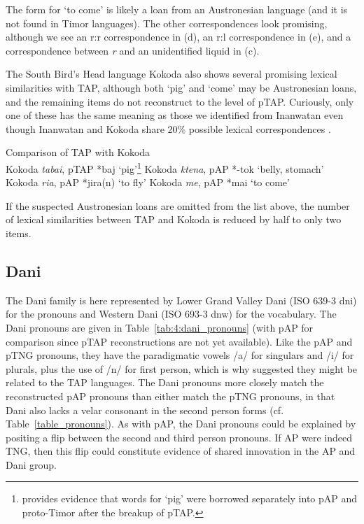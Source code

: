 The form for `to come' is likely a loan from an Austronesian language (and it is not found in Timor languages). The other correspondences look promising, although we see an r:r correspondence in (d), an r:l correspondence in (e), and a correspondence between \textit{r} and an unidentified liquid in (c).

The South Bird's Head language Kokoda also shows several promising lexical similarities with TAP, although both `pig' and `come' may be Austronesian loans, and the remaining items do not reconstruct to the level of pTAP. Curiously, only one of these has the same meaning as those we identified from Inanwatan even though Inanwatan and Kokoda share 20\% possible lexical correspondences \citep[133]{DeVries2004}.

\enlargethispage{1em}

\ea%
\label{ex:4:57}
\upshape 
  Comparison of TAP with Kokoda \citep{DeVries2004} \\
  \ea \upshape Kokoda \textit{ta{\textprimstress}bai}, pTAP *baj `pig'\footnote{\citet{Robinsontaalorpantar} provides evidence that words for `pig' were borrowed separately into pAP and proto-Timor after the breakup of pTAP.}
  \ex \upshape  Kokoda \textit{k{\textopeno}{\textprimstress}tena}, pAP *-tok `belly, stomach'
  \ex \upshape  Kokoda \textit{{\textprimstress}{\textbardotlessj}{\textepsilon}ria}, pAP *jira(n) `to fly'
  \ex \upshape  Kokoda \textit{m{\textopeno}e}, pAP *mai `to come' 
  \z
\z

If the suspected Austronesian loans are omitted from the list above, the number of lexical similarities between TAP and Kokoda is reduced by half to only two items.

\subsection{Dani}
The Dani family is here represented by Lower Grand Valley Dani (ISO 639-3 dni) for the pronouns and Western Dani (ISO 693-3 dnw) for the vocabulary. The Dani pronouns are given in Table~\ref{tab:4:dani_pronouns} (with pAP for comparison since pTAP reconstructions are not yet available). Like the pAP and pTNG pronouns, they have the paradigmatic vowels /a/ for singulars and /i/ for plurals, plus the use of /n/ for first person, which is why \citet{Ross2005} suggested they might be related to the TAP languages. The Dani pronouns more closely match the reconstructed pAP pronouns than either match the pTNG pronouns, in that Dani also lacks a velar consonant in the second person forms (cf. Table~\ref{table_pronouns}). As with pAP, the Dani pronouns could be explained by positing a flip between the second and third person pronouns. If AP were indeed TNG, then this flip could constitute evidence of shared innovation in the AP and Dani group.


